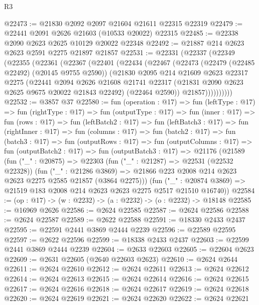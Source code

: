 \begin{lexlean}{R3}
\begin{coremodule}
@22473 := @21830 @2092 @2097 @21604 @21611 @22315 @22319
@22479 := @22441 @2091 @2626 @21603 (@10533 @20022) @22315
@22485 := @22338 @2090 @2623 @2625 @10129 @20022 @22348
@22492 := @21887 @214 @2623 @2623 @2591 @2275 @21897 @21857
@22531 := @22331
    (@22337
      (@22349
        (@22355
          (@22361
            (@22367
              (@22401
                (@22434
                  (@22467
                    (@22473
                      (@22479 (@22485 @22492) (@20145 @9755 @2590))
                      (@21830
                        @2095
                        @214
                        @21609
                        @2623
                        @22317
                        @2275
                        (@22441
                          @2094
                          @2626
                          @21608
                          @21741
                          @22317
                          (@21831 @2090 @2623 @2625 @9675 @20022 @21843 @22492)
                          (@22464 @2590))
                        @21857))))))))))
@22532 := @3857 @37
@22580 := fun (operation : @17) =>
  fun (leftType : @17) =>
  fun (rightType : @17) =>
  fun (outputType : @17) =>
  fun (inner : @17) =>
  fun (rows : @17) =>
  fun (leftBatch2 : @17) =>
  fun (leftBatch3 : @17) =>
  fun (rightInner : @17) =>
  fun (columns : @17) =>
  fun (batch2 : @17) =>
  fun (batch3 : @17) =>
  fun (outputRows : @17) =>
  fun (outputColumns : @17) =>
  fun (outputBatch2 : @17) =>
  fun (outputBatch3 : @17) =>
  @21176
    (@21589
      (fun ("_" : @20875) =>
      @22303
        (fun ("_" : @21287) => @22531 (@22532 @22328))
        (fun ("_" : @21286 @3869) =>
        @21866 @223 @2008 @214 @2623 @2623 @2275 @2585 @21857 (@3864 @2275)))
      (fun ("_" : @20874 @3869) => @21519 @183 @2008 @214 @2623 @2623 @2275 @2517 @21510 @16740))
@22584 := (op : @17) -> (w : @2232) -> (a : @2232) -> (o : @2232) -> @18148
@22585 := @16969 @2626
@22586 := @2624 @22585
@22587 := @2624 @22586
@22588 := @2624 @22587
@22589 := @2622 @22588
@22591 := @18330 @2433 @2437
@22595 := @22591 @2441 @3869 @2444 @2239
@22596 := @22589 @22595
@22597 := @2622 @22596
@22599 := @18338 @2433 @2437
@22603 := @22599 @2441 @3869 @2444 @2239
@22604 := @2633 @22603
@22605 := @22604 @2623
@22609 := @2631 @22605 (@2640 @22603 @2623)
@22610 := @2624 @2644
@22611 := @2624 @22610
@22612 := @2624 @22611
@22613 := @2624 @22612
@22614 := @2624 @22613
@22615 := @2624 @22614
@22616 := @2624 @22615
@22617 := @2624 @22616
@22618 := @2624 @22617
@22619 := @2624 @22618
@22620 := @2624 @22619
@22621 := @2624 @22620
@22622 := @2624 @22621

\end{coremodule}
\end{lexlean}

